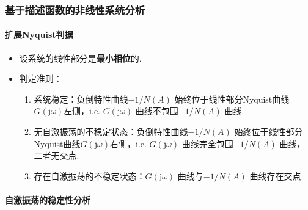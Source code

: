 \documentclass[14pt,a4paper]{article}
\theoremstyle{plain}
\theoremstyle{definition}
\theoremstyle{remark}
\theoremstyle{plain}
\theoremstyle{plain}
\theoremstyle{plain}
\theoremstyle{definition}
\theoremstyle{remark}
\numberwithin{equation}{section}
\begin{document}
            \subsubsection{基于描述函数的非线性系统分析}%
            \label{ssub:基于描述函数的非线性系统分析}
            
                \paragraph{扩展Nyquist判据}%
                \label{par:扩展nyquist判据}
                
                    \begin{itemize}
                        \item 设系统的线性部分是\textbf{最小相位}的. 
                        \item 判定准则：
                            \begin{enumerate}
                                \item 系统稳定：负倒特性曲线$-1 / N(A)$ 始终位于线性部分Nyquist曲线$G(\mathrm j \omega)$左侧，i.e. $G(\mathrm j \omega)$ 曲线不包围$-1 / N(A)$ 曲线. 
                                \item 无自激振荡的不稳定状态：负倒特性曲线$-1 / N(A)$ 始终位于线性部分Nyquist曲线$G(\mathrm j \omega)$右侧，i.e. $G(\mathrm j \omega)$ 曲线完全包围$-1 / N(A)$ 曲线，二者无交点.
                                \item 存在自激振荡的不稳定状态：$G(\mathrm j \omega)$ 曲线与$-1 / N(A)$ 曲线存在交点.
                            \end{enumerate}
                    \end{itemize} 

                \paragraph{自激振荡的稳定性分析}%
                \label{par:自激振荡的稳定性分析}
\end{document}
